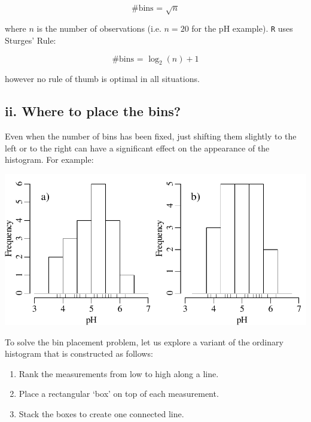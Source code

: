 \begin{equation}
  \mbox{\#{bins} = } \sqrt{n}
\end{equation}

\noindent where $n$ is the number of observations (i.e. $n = 20$ for
the pH example). \texttt{R} uses Sturges' Rule:

\begin{equation}
  \mbox{\#{bins} = } \log_2(n) + 1
\end{equation}

\noindent however no rule of thumb is optimal in all situations.

\subsection*{ii. Where to place the bins?}

Even when the number of bins has been fixed, just shifting them
slightly to the left or to the right can have a significant effect on
the appearance of the histogram. For example:

\noindent\begin{minipage}[t][][b]{.5\textwidth}
  \includegraphics[width=\textwidth]{../figures/binpos.pdf}\medskip
\end{minipage}
\begin{minipage}[t][][t]{.5\textwidth}
  \label{fig:binpos}
\end{minipage}
  
To solve the bin placement problem, let us explore a variant of the
ordinary histogram that is constructed as follows:

\begin{enumerate}
\item Rank the measurements from low to high along a line.
\item Place a rectangular `box' on top of each measurement.
\item Stack the boxes to create one connected line.
\end{enumerate}

